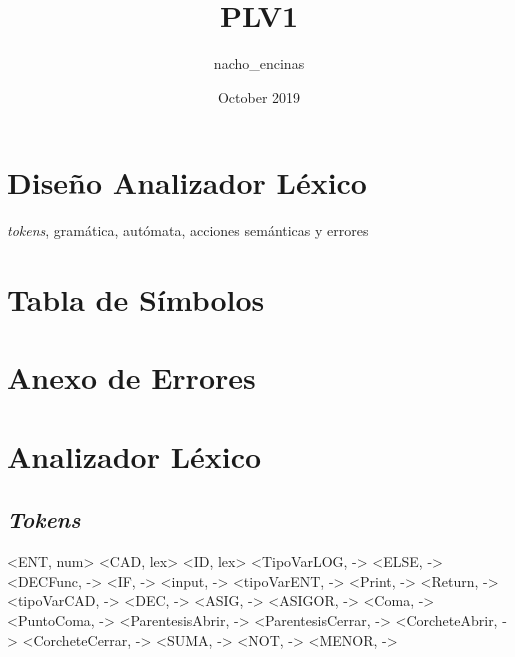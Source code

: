 \documentclass{article}
\title{PLV1}
\author{nacho_encinas }
\date{October 2019}
\begin{document}
\maketitle 

\section{Diseño Analizador Léxico}
\emph{tokens}, gramática, autómata, acciones semánticas y errores
\section{Tabla de Símbolos}
\section{Anexo de Errores}
\newpage


\section*{Analizador Léxico}
\subsection*{\emph{Tokens}}

\< \>
\newline \medskip
<ENT, num>
\newline \medskip
<CAD, lex>
\newline \medskip
<ID, lex>
\newline \medskip
<TipoVarLOG, ->
\newline \medskip
<ELSE, ->
\newline \medskip
<DECFunc, ->
\newline \medskip
<IF, ->
\newline \medskip
<input, ->
\newline \medskip
<tipoVarENT, ->
\newline \medskip
<Print, ->
\newline \medskip
<Return, ->
\newline \medskip
<tipoVarCAD, ->
\newline \medskip
<DEC, ->
\newline \medskip
<ASIG, ->
\newline \medskip
<ASIGOR, ->
\newline \medskip
<Coma, ->
\newline \medskip
<PuntoComa, ->
\newline \medskip
<ParentesisAbrir, ->
\newline \medskip
<ParentesisCerrar, ->
\newline \medskip
<CorcheteAbrir, ->
\newline \medskip
<CorcheteCerrar, ->
\newline \medskip
<SUMA, ->
\newline \medskip
<NOT, ->
\newline \medskip
<MENOR, ->
\end{document}
